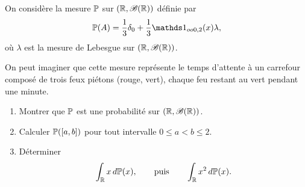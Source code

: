 \begin{td-exo}[] %
    On considère la mesure \(\mathbb{P}\) sur \((\mathbb{R},\mathscr{B}(\mathbb{R}))\) définie par
    \begin{equation*}
        \bb P(A) = \frac 13 \delta_0 + \frac 13 \one_{oo{0,2}}(x)\lambda,
    \end{equation*}
    où \(\lambda\) est la mesure de Lebesgue sur \((\mathbb{R},\mathscr{B}(\mathbb{R}))\).

    On peut imaginer que cette mesure représente le temps d'attente à un
    carrefour composé de trois feux piétons (rouge, vert), chaque feu
    restant au vert pendant une minute.

    \begin{enumerate}
        \item Montrer que \(\mathbb{P}\) est une probabilité sur \((\mathbb{R},\mathscr{B}(\mathbb{R}))\).

        \item Calculer \(\mathbb{P}(\mathopen{}\left[a,b\right]\mathclose{})\) pour tout intervalle \(0\le a<b\le 2\).

        \item Déterminer
        \begin{equation*}
            \int_{\mathbb{R}} x \mathop{}\!{d}\mathbb{P}(x),\qquad\text{puis}\qquad\int_{\mathbb{R}} x^2 \mathop{}\!{d}\mathbb{P}(x).
        \end{equation*}
    \end{enumerate}
\end{td-exo}

